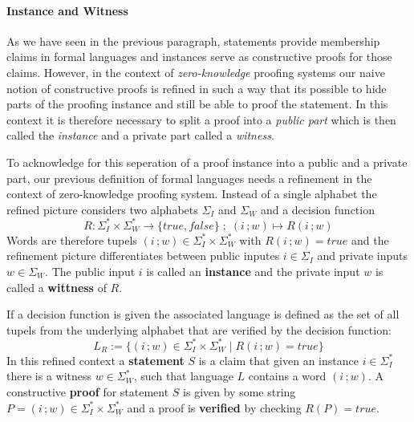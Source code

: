 \paragraph{Instance and Witness}
As we have seen in the previous paragraph, statements provide membership claims in formal languages and instances serve as constructive proofs for those claims. However, in the context of \textit{zero-knowledge} proofing systems our naive notion of constructive proofs is refined in such a way that  its possible to hide parts of the proofing instance and still be able to proof the statement. In this context it is therefore necessary to split a proof into a \textit{public part} which is then called the \textit{instance} and a private part called a \textit{witness}.

To acknowledge for this seperation of a proof instance into a public and a private part, our previous definition of formal languages needs a refinement in the context of zero-knowledge proofing system. Instead of a single alphabet the refined picture considers two alphabets $\Sigma_I$ and $\Sigma_W$ and a decision function 
\begin{equation}
R: \Sigma_I^* \times \Sigma_W^* \to \{true, false\}\;;\; (i\,;w) \mapsto R(i\,;w)
\end{equation}
Words are therefore tupels $(i\,;w)\in \Sigma_I^* \times \Sigma_W^*$ with $R(i\,;w)=true$ and the refinement picture differentiates between public inputes $i\in \Sigma_I$ and private inputs $w\in \Sigma_W$. The public input $i$ is called an \textbf{instance} and the private input $w$ is called a \textbf{wittness} of $R$. 

If a decision function is given the associated language is defined as the set of all tupels from the underlying alphabet that are verified by the decision function:
\begin{equation}
L_R := \{(i\,;w)\in \Sigma_I^* \times \Sigma_W^* \;|\; R(i\,;w)=true\}
\end{equation}
In this refined context a \textbf{statement} $S$ is a claim that given an instance $i\in\Sigma_I^*$ there is a witness $w\in \Sigma_W^*$, such that language $L$ contains a word $(i\,;w)$. A constructive \textbf{proof} for statement $S$ is given by some string $P=(i\,; w) \in \Sigma_I^* \times \Sigma_W^*$ and a proof is \textbf{verified} by checking $R(P)=true$. 

